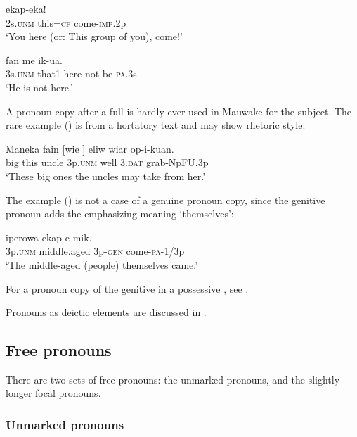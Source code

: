 \ea%
\label{ex:x530}
\gll {}  ekap-eka! \\
2s.\textsc{unm} this=\textsc{cf} come-\textsc{imp}.2p\\
\glt`You here (or: This group of you), come!'
\z

\ea%
\label{ex:x531}
\gll {}  fan me ik-ua. \\
3s.\textsc{unm} that1 here not be-\textsc{pa}.3s\\
\glt`He is not here.'
\z

A pronoun copy after a full  is hardly ever used in Mauwake for the subject. The rare example () is from a hortatory text and may show rhetoric style:

\ea%
\label{ex:x683}
\gll Maneka fain [wie ] eliw wiar op-i-kuan. \\
big this uncle 3p.\textsc{unm} well 3.\textsc{dat} grab-NpFU.3p\\
\glt`These big ones the uncles may take from her.'
\z

The example () is not a case of a genuine pronoun copy, since the genitive pronoun  adds the emphasizing meaning `themselves':

\ea%
\label{ex:x532}
\gll {}  iperowa  ekap-e-mik. \\
3p.\textsc{unm} middle.aged 3p-\textsc{gen} come-\textsc{pa}-1/3p\\
\glt`The middle-aged (people) themselves came.' 
\z

For a pronoun copy of the genitive in a possessive , see .

Pronouns as deictic elements are discussed in .

\subsection{Free pronouns}
{}
There are two sets of free pronouns: the unmarked pronouns, and the slightly longer focal pronouns.

\subsubsection[Unmarked pronouns]{Unmarked pronouns}
{}


